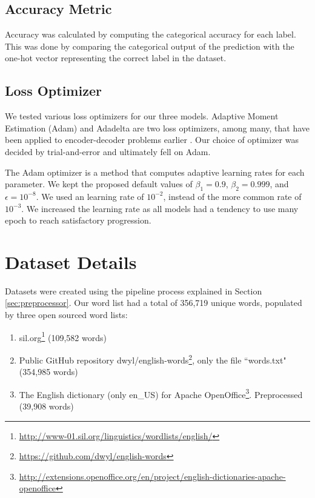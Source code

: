 \subsection{Accuracy Metric}
Accuracy was calculated by computing the categorical accuracy for each label. This was done by comparing the categorical output of the prediction with the one-hot vector representing the correct label in the dataset.

\subsection{Loss Optimizer}
We tested various loss optimizers for our three models. Adaptive Moment Estimation (Adam) \citep{kingma2014adam} and Adadelta \citep{zeiler2012adadelta} are two loss optimizers, among many, that have been applied to encoder-decoder problems earlier \citep{cho2014properties, arik2017deep}. Our choice of optimizer was decided by trial-and-error and ultimately fell on Adam.

The Adam optimizer is a method that computes adaptive learning rates for each parameter. We kept the proposed default values of \(\beta_{1} = 0.9\), \(\beta_{2} = 0.999\), and \(\epsilon = 10^{-8}\). We used an learning rate of \(10^{-2}\), instead of the more common rate of \(10^{-3}\). We increased the learning rate as all models had a tendency to use many epoch to reach satisfactory progression.

\section{Dataset Details}
Datasets were created using the pipeline process explained in Section \ref{sec:preprocessor}. Our word list had a total of 356,719 unique words, populated by three open sourced word lists:

\begin{enumerate}
    \item sil.org\footnote{\url{http://www-01.sil.org/linguistics/wordlists/english/}} (109,582 words)
    \item Public GitHub repository dwyl/english-words\footnote{\url{https://github.com/dwyl/english-words}}, only the file ``words.txt" (354,985 words) 
    \item The English dictionary (only en\_US) for Apache OpenOffice\footnote{\url{http://extensions.openoffice.org/en/project/english-dictionaries-apache-openoffice}}. Preprocessed (39,908 words)
\end{enumerate}

